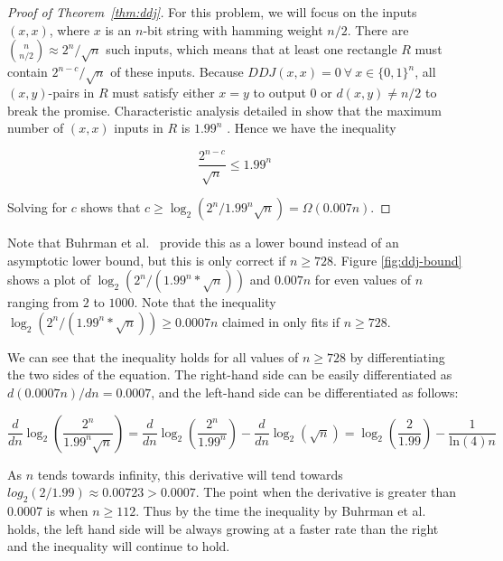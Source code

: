 \documentclass[a4paper]{article}
\begin{document}
\begin{appendices}
\begin{proof}[Proof of Theorem~\ref{thm:ddj}]
        For this problem, we will focus on the inputs $(x, x)$, where $x$ is an $n$-bit string with hamming weight $n/2$. There are $\binom{n}{n/2} \approx 2^n/\sqrt{n}$ such inputs, which means that at least one rectangle $R$ must contain $2^{n-c}/\sqrt{n}$ of these inputs. Because $DDJ(x, x) = 0 ~\forall~x\in \{0, 1\}^n$, all $(x, y)$-pairs in $R$ must satisfy either $x = y$ to output $0$ or $d(x, y) \neq n/2$ to break the promise. Characteristic analysis detailed in \cite{RevModPhys.82.665} show that the maximum number of $(x, x)$ inputs in $R$ is $1.99^n$ \cite{frankl1987forbidden}. Hence we have the inequality

        $$\frac{2^{n-c}}{\sqrt{n}} \leq 1.99^n$$

        Solving for $c$ shows that $c \geq \log_2(2^n/1.99^n\sqrt{n}) = \Omega(0.007n)$.
    \end{proof}

        Note that Buhrman et al.~\cite{RevModPhys.82.665} provide this as a lower bound instead of an asymptotic lower bound, but this is only correct if $n \geq 728$. Figure \ref{fig:ddj-bound} shows a plot of $\log_2(2^n/(1.99^n*\sqrt{n}))$ and $0.007n$ for even values of $n$ ranging from $2$ to $1000$. Note that the inequality $\log_2(2^n/(1.99^n*\sqrt{n})) \geq 0.0007n$ claimed in \cite{RevModPhys.82.665} only fits if $n \geq 728$.

        We can see that the inequality holds for all values of $n \geq 728$ by differentiating the two sides of the equation. The right-hand side can be easily differentiated as $d(0.0007n)/dn = 0.0007$, and the left-hand side can be differentiated as follows:

        $$\frac{d}{dn}\log_2\left(\frac{2^n}{1.99^n\sqrt{n}}\right) = \frac{d}{dn}\log_2\left(\frac{2^n}{1.99^n}\right) - \frac{d}{dn}\log_2(\sqrt{n}) = \log_2\left(\frac{2}{1.99}\right) - \frac{1}{\textrm{ln}(4)n}$$

        As $n$ tends towards infinity, this derivative will tend towards $log_2(2/1.99) \approx 0.00723 > 0.0007$. The point when the derivative is greater than 0.0007 is when $n \geq 112$. Thus by the time the inequality by Buhrman et al.~ holds, the left hand side will be always growing at a faster rate than the right and the inequality will continue to hold.


\end{appendices}
\end{document}
